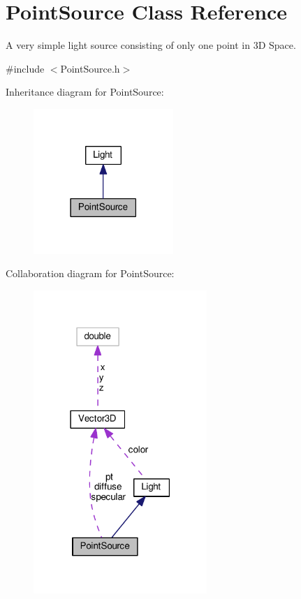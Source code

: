 \hypertarget{classPointSource}{}\section{Point\+Source Class Reference}
\label{classPointSource}


A very simple light source consisting of only one point in 3D Space.  




{\ttfamily \#include $<$Point\+Source.\+h$>$}



Inheritance diagram for Point\+Source\+:\nopagebreak
\begin{figure}[H]
\begin{center}
\leavevmode
\includegraphics[width=150pt]{classPointSource__inherit__graph}
\end{center}
\end{figure}


Collaboration diagram for Point\+Source\+:\nopagebreak
\begin{figure}[H]
\begin{center}
\leavevmode
\includegraphics[width=186pt]{classPointSource__coll__graph}
\end{center}
\end{figure}
